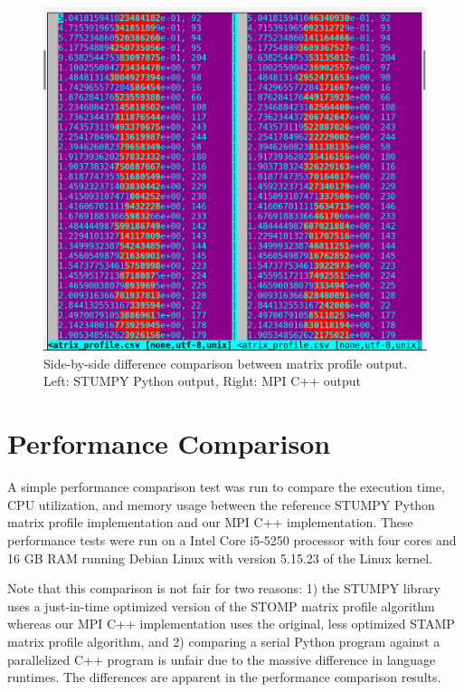 \documentclass[conference]{IEEEtran}
\begin{document}
\begin{figure}
\begin{center}
\includegraphics[scale=0.42]{matrix_profile_diff.png}
\caption{Side-by-side difference comparison between matrix profile output.   Left: STUMPY Python output, Right: MPI C++ output}
\label{fig:Matrix_Profile_Diff}
\end{center}
\end{figure}

\section{Performance Comparison}

A simple performance comparison test was run to compare the execution time, CPU utilization, and memory usage between the reference STUMPY Python matrix profile implementation and our MPI C++ implementation.  These performance tests were run on a Intel Core i5-5250 processor with four cores and 16 GB RAM running Debian Linux with version 5.15.23 of the Linux kernel.  

Note that this comparison is not fair for two reasons:  1) the STUMPY library uses a just-in-time optimized version of the STOMP matrix profile algorithm\cite{Stumpy} whereas our MPI C++ implementation uses the original, less optimized STAMP matrix profile algorithm\cite{MatrixProfile1}, and 2) comparing a serial Python program against a parallelized C++ program is unfair due to the massive difference in language runtimes.  The differences are apparent in the performance comparison results. 
\end{document}
